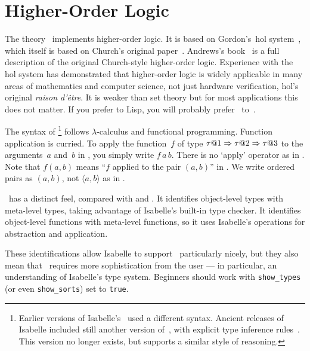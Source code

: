 \chapter{Higher-Order Logic}

The theory~ implements higher-order logic.  It is based on
Gordon's~{\sc hol} system~\cite{mgordon-hol}, which itself is based on
Church's original paper~\cite{church40}.  Andrews's
book~\cite{andrews86} is a full description of the original
Church-style higher-order logic.  Experience with the {\sc hol} system
has demonstrated that higher-order logic is widely applicable in many
areas of mathematics and computer science, not just hardware
verification, {\sc hol}'s original \textit{raison d'\^etre\/}.  It is
weaker than {\ZF} set theory but for most applications this does not
matter.  If you prefer {\ML} to Lisp, you will probably prefer \HOL\ 
to~{\ZF}.

The syntax of \HOL\footnote{Earlier versions of Isabelle's \HOL\ used a
different syntax.  Ancient releases of Isabelle included still another version
of~\HOL, with explicit type inference rules~\cite{paulson-COLOG}.  This
version no longer exists, but \thydx{ZF} supports a similar style of
reasoning.} follows $\lambda$-calculus and functional programming.  Function
application is curried.  To apply the function~$f$ of type
$\tau@1\To\tau@2\To\tau@3$ to the arguments~$a$ and~$b$ in \HOL, you simply
write $f\,a\,b$.  There is no `apply' operator as in \thydx{ZF}.  Note that
$f(a,b)$ means ``$f$ applied to the pair $(a,b)$'' in \HOL.  We write ordered
pairs as $(a,b)$, not $\langle a,b\rangle$ as in {\ZF}.

\HOL\ has a distinct feel, compared with {\ZF} and {\CTT}.  It
identifies object-level types with meta-level types, taking advantage of
Isabelle's built-in type checker.  It identifies object-level functions
with meta-level functions, so it uses Isabelle's operations for abstraction
and application.

These identifications allow Isabelle to support \HOL\ particularly
nicely, but they also mean that \HOL\ requires more sophistication
from the user --- in particular, an understanding of Isabelle's type
system.  Beginners should work with \texttt{show_types} (or even
\texttt{show_sorts}) set to \texttt{true}.


